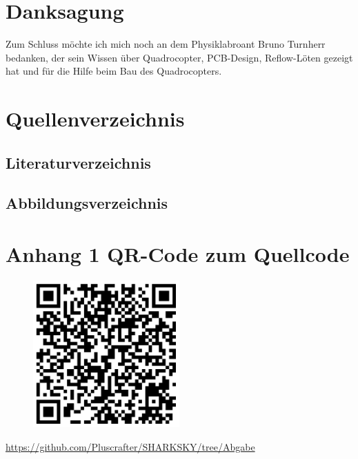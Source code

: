 \documentclass[12pt,a4paper, ngerman]{article}
\begin{document}
\section{Danksagung}
Zum Schluss möchte ich mich noch an dem Physiklabroant Bruno Turnherr bedanken, der sein Wissen über Quadrocopter, PCB-Design, Reflow-Löten gezeigt hat und für die Hilfe beim Bau des Quadrocopters. 

\newpage
\section{Quellenverzeichnis}
\subsection{Literaturverzeichnis}
\printbibliography[heading=none]
\subsection{Abbildungsverzeichnis}
\makeatletter
{}%
\makeatother
\newpage
\section{Anhang 1 QR-Code zum Quellcode}
\begin{figure}[h!]
\centering
\includegraphics[width=0.5\textwidth]{qrcode.png}
\end{figure}
\centering\large{\url{https://github.com/Pluscrafter/SHARKSKY/tree/Abgabe}}
\newpage
\end{document}
